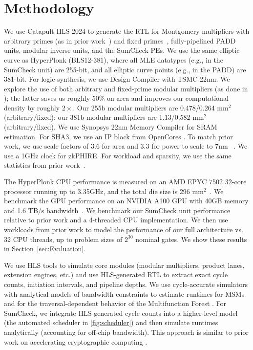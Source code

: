 \section{Methodology}
\label{sec:Methodology}
We use Catapult HLS 2024 to generate the RTL for Montgomery multipliers with arbitrary primes (as in prior work~\cite{szkp, zkspeed2025}) and fixed primes~\cite{BLS12_381_paper, BLS12_381_web}, fully-pipelined PADD units, modular inverse units, and the SumCheck PEs.
We use the same elliptic curve as HyperPlonk (BLS12-381), where all MLE datatypes (e.g., in the SumCheck unit) are 255-bit, and all elliptic curve points (e.g., in the PADD) are 381-bit.
For logic synthesis, we use Design Compiler with TSMC 22nm. 
We explore the use of both arbitrary and fixed-prime modular multipliers (as done in \cite{nocap}); the latter saves us roughly 50\% on area and improves our computational density by roughly $2\times$.
Our 255b modular multipliers are 0.478/0.264 mm$^2$ (arbitrary/fixed); our 381b modular multipliers are 1.13/0.582 mm$^2$ (arbitrary/fixed).
We use Synopsys 22nm Memory Compiler for SRAM estimation.
For SHA3, we use an IP block from OpenCores \cite{opencores_sha3}.
To match prior work, we use scale factors of $3.6$ for area and $3.3$ for power to scale to 7nm ~\cite{szkp, zkspeed2025, 22nm_TSMC_web, 16nm_TSMC_paper, 7nm_TSMC_paper}.
We use a 1GHz clock for zkPHIRE.
For workload and sparsity, we use the same statistics from prior work~\cite{szkp, gzkp, pipezk, libsnark}.

The HyperPlonk CPU performance is measured on an AMD EPYC 7502 32-core processor running up to 3.35GHz, and the total die size is 296 mm$^2$~\cite{cpu_amd1, cpu_amd2, cpu_amd3}. 
We benchmark the GPU performance on an NVIDIA A100 GPU with 40GB memory and 1.6 TB/s bandwidth~\cite{NVIDIA-A100-40-GPU}.
We benchmark our SumCheck unit performance relative to prior work \cite{zkspeed2025} and a 4-threaded CPU implementation.
We then use workloads from prior work \cite{hyperplonk, libsnark} to model the performance of our full architecture vs. 32 CPU threads, up to problem sizes of $2^{30}$ nominal gates. We show these results in Section~\ref{sec:Evaluation}. 


We use HLS tools to simulate core modules (modular multipliers, product lanes, extension engines, etc.) and use HLS-generated RTL to extract exact cycle counts, initiation intervals, and pipeline depths.
We use cycle-accurate simulators with analytical models of bandwidth constraints to estimate runtimes for MSMs and for the traversal-dependent behavior of the Multifunction Forest \cite{mo2025mtu}.
For SumCheck, we integrate HLS-generated cycle counts into a higher-level model (the automated scheduler in \autoref{fig:scheduler}) and then simulate runtimes analytically (accounting for off-chip bandwidth).
This approach is similar to prior work on accelerating cryptographic computing \cite{zkspeed2025, szkp, samardzic2021_F1, craterlake}.



